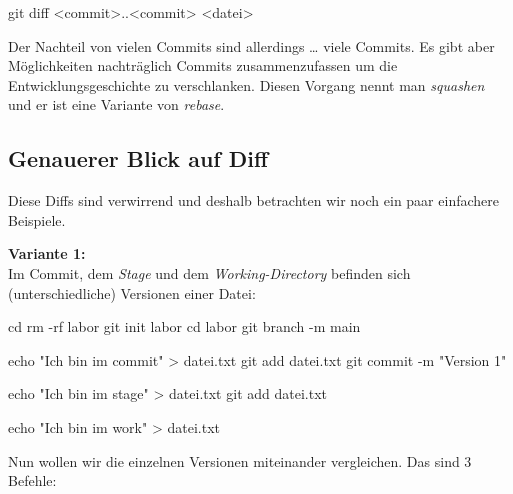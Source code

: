 \documentclass[
  ngerman,
  letterpaper,
  DIV=11]{scrreprt}
\newenvironment{Shaded}{\begin{snugshade}}{\end{snugshade}}
\newcommand{\AttributeTok}[1]{\textcolor[rgb]{0.40,0.45,0.13}{#1}}
\newcommand{\BuiltInTok}[1]{\textcolor[rgb]{0.00,0.23,0.31}{#1}}
\newcommand{\FunctionTok}[1]{\textcolor[rgb]{0.28,0.35,0.67}{#1}}
\newcommand{\NormalTok}[1]{\textcolor[rgb]{0.00,0.23,0.31}{#1}}
\newcommand{\OperatorTok}[1]{\textcolor[rgb]{0.37,0.37,0.37}{#1}}
\newcommand{\StringTok}[1]{\textcolor[rgb]{0.13,0.47,0.30}{#1}}
\newcommand{\stage}{\textit{Stage}\xspace}
\newcommand{\work}{\textit{Working-Directory}\xspace}
\begin{document}
\begin{Shaded}
\begin{Highlighting}[]
\FunctionTok{git}\NormalTok{ diff }\OperatorTok{\textless{}}\NormalTok{commit}\OperatorTok{\textgreater{}}\NormalTok{..}\OperatorTok{\textless{}}\NormalTok{commit}\OperatorTok{\textgreater{}} \OperatorTok{\textless{}}\NormalTok{datei}\OperatorTok{\textgreater{}}
\end{Highlighting}
\end{Shaded}

Der Nachteil von vielen Commits sind allerdings \ldots{} viele Commits.
Es gibt aber Möglichkeiten nachträglich Commits zusammenzufassen um die
Entwicklungsgeschichte zu verschlanken. Diesen Vorgang nennt man
\emph{squashen} und er ist eine Variante von \emph{rebase}.

\subsection{Genauerer Blick auf Diff}\label{genauerer-blick-auf-diff}

Diese Diffs sind verwirrend und deshalb betrachten wir noch ein paar
einfachere Beispiele.

\textbf{Variante 1:}\\
Im Commit, dem \stage und dem \work  befinden sich (unterschiedliche)
Versionen einer Datei:

\begin{Shaded}
\begin{Highlighting}[]
\BuiltInTok{cd} 
\FunctionTok{rm} \AttributeTok{{-}rf}\NormalTok{ labor }
\FunctionTok{git}\NormalTok{ init labor}
\BuiltInTok{cd}\NormalTok{ labor }
\FunctionTok{git}\NormalTok{ branch }\AttributeTok{{-}m}\NormalTok{ main }

\BuiltInTok{echo} \StringTok{"Ich bin im commit"} \OperatorTok{\textgreater{}}\NormalTok{ datei.txt }
\FunctionTok{git}\NormalTok{ add datei.txt }
\FunctionTok{git}\NormalTok{ commit }\AttributeTok{{-}m} \StringTok{"Version 1"}

\BuiltInTok{echo} \StringTok{"Ich bin im stage"} \OperatorTok{\textgreater{}}\NormalTok{ datei.txt }
\FunctionTok{git}\NormalTok{ add datei.txt }

\BuiltInTok{echo} \StringTok{"Ich bin im work"} \OperatorTok{\textgreater{}}\NormalTok{ datei.txt }
\end{Highlighting}
\end{Shaded}

Nun wollen wir die einzelnen Versionen miteinander vergleichen. Das sind
3 Befehle:
\end{document}
